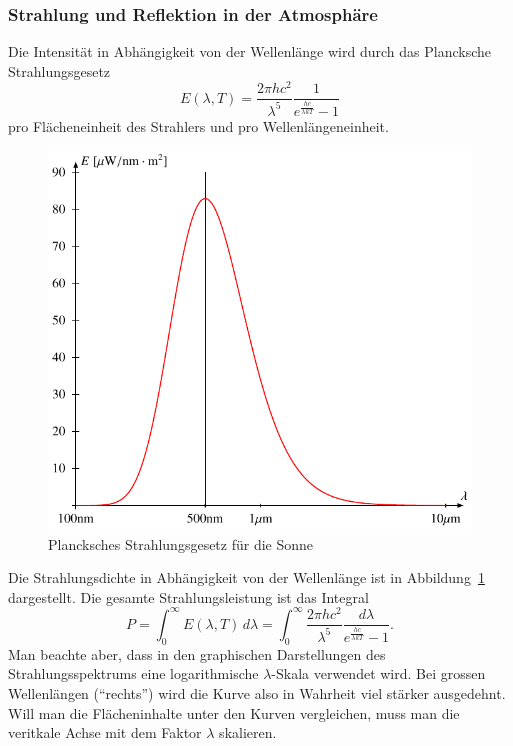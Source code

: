 \subsubsection{Strahlung und Reflektion in der Atmosphäre}
Die Intensität in Abhängigkeit von der Wellenlänge wird durch das Plancksche
Strahlungsgesetz
\begin{equation}
E(\lambda,T)
=
\frac{2\pi hc^2}{\lambda^5}\frac{1}{e^{\frac{hc}{\lambda kT}}-1}
\end{equation}
pro Flächeneinheit des Strahlers und pro Wellenlängeneinheit.
\begin{figure}
\centering
\includegraphics{chapters/1/planck.pdf}
\caption{Plancksches Strahlungsgesetz für die Sonne
\label{skript:planck-kurve}}
\end{figure}
Die Strahlungsdichte in Abhängigkeit von der Wellenlänge ist in
Abbildung~\ref{skript:planck-kurve} dargestellt.
Die gesamte Strahlungsleistung ist das Integral
\[
P
=
\int_{0}^\infty E(\lambda,T)\,d\lambda
=
\int_{0}^\infty 
\frac{2\pi hc^2}{\lambda^5}\frac{d\lambda}{e^{\frac{hc}{\lambda kT}}-1}.
\]
Man beachte aber, dass in den graphischen Darstellungen des
Strahlungsspektrums eine logarithmische $\lambda$-Skala
verwendet wird.
Bei grossen Wellenlängen (``rechts'') wird die Kurve also in Wahrheit
viel stärker ausgedehnt.
Will man die Flächeninhalte unter den Kurven vergleichen, muss man
die veritkale Achse mit dem Faktor $\lambda$ skalieren.

